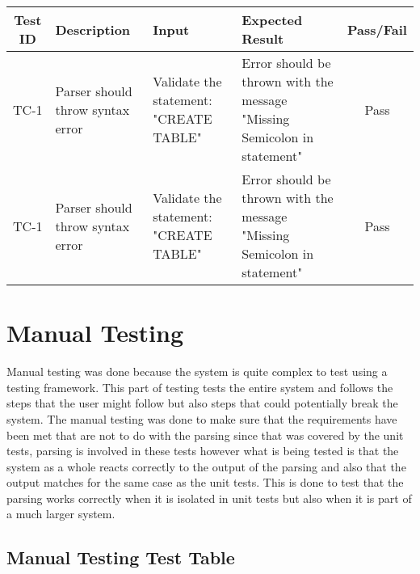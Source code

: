\begin{center}
	\setlength\extrarowheight{2pt}
	\begin{tabularx}{\textwidth}{|c|X|X|X|c|}
		\hline
		\textbf{Test ID} & \textbf{Description} & \textbf{Input} & \textbf{Expected Result} & \textbf{Pass/Fail} \\
		\hline
		TC-1 & Parser should throw syntax error & Validate the statement: "CREATE TABLE" & Error should be thrown with the message "Missing Semicolon in statement" & Pass \\
		\hline
		TC-1 & Parser should throw syntax error & Validate the statement: "CREATE TABLE" & Error should be thrown with the message "Missing Semicolon in statement" & Pass \\
		\hline
	\end{tabularx}
\end{center}

\section{Manual Testing}

Manual testing was done because the system is quite complex to test using a testing framework. This part of testing tests the entire system and follows the steps that the user might follow but also steps that could potentially break the system. The manual testing was done to make sure that the requirements have been met that are not to do with the parsing since that was covered by the unit tests, parsing is involved in these tests however what is being tested is that the system as a whole reacts correctly to the output of the parsing and also that the output matches for the same case as the unit tests. This is done to test that the parsing works correctly when it is isolated in unit tests but also when it is part of a much larger system.

\subsection{Manual Testing Test Table}

